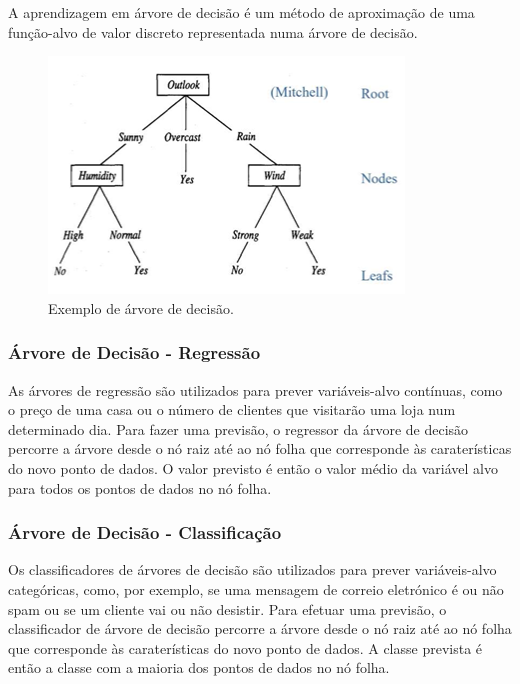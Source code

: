 \documentclass[conference]{IEEEtran}
\begin{document}
A aprendizagem em árvore de decisão é um método de aproximação de uma função-alvo de valor discreto representada numa árvore de decisão. \cite{madureira2024dt}

\begin{figure}[h]
	\centering
	\includegraphics[width=0.9\linewidth]{Decision_Trees_example}
	\caption{Exemplo de árvore de decisão. \cite{madureira2024dt}}
	\label{fig:Decision_Trees_example}
\end{figure}

\subsubsection{Árvore de Decisão - Regressão}

As árvores de regressão são utilizados para prever variáveis-alvo contínuas, como o preço de uma casa ou o número de clientes que visitarão uma loja num determinado dia. Para fazer uma previsão, o regressor da árvore de decisão percorre a árvore desde o nó raiz até ao nó folha que corresponde às caraterísticas do novo ponto de dados. O valor previsto é então o valor médio da variável alvo para todos os pontos de dados no nó folha. \cite{ohekar_what_2023}

\medskip
\subsubsection{Árvore de Decisão - Classificação}

Os classificadores de árvores de decisão são utilizados para prever variáveis-alvo categóricas, como, por exemplo, se uma mensagem de correio eletrónico é ou não spam ou se um cliente vai ou não desistir. Para efetuar uma previsão, o classificador de árvore de decisão percorre a árvore desde o nó raiz até ao nó folha que corresponde às caraterísticas do novo ponto de dados. A classe prevista é então a classe com a maioria dos pontos de dados no nó folha. \cite{ohekar_what_2023}
\end{document}

